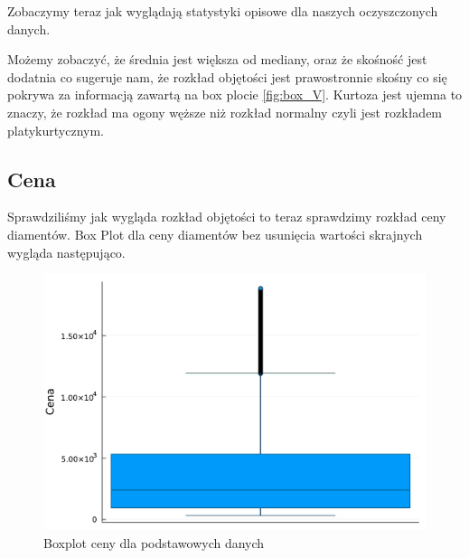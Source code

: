 \documentclass[12pt,leqno]{article}
\theoremstyle{exer}
\begin{document}
	Zobaczymy teraz jak wyglądają statystyki opisowe dla naszych oczyszczonych danych.
	
	\begin{table}[H]
		\caption{Podstawowe statystyki opisowe dla objętości}
		\label{tab:statystyki_V}
	\end{table}
	Możemy zobaczyć, że średnia jest większa  od mediany, oraz że skośność jest dodatnia co sugeruje nam, że rozkład objętości jest prawostronnie skośny co się pokrywa za informacją zawartą na box plocie \ref{fig:box_V}. Kurtoza jest ujemna to znaczy, że rozkład ma ogony węższe niż rozkład normalny czyli jest rozkładem platykurtycznym. 
	
	\subsection{Cena}
	Sprawdziliśmy jak wygląda rozkład objętości to teraz sprawdzimy rozkład ceny diamentów.
	Box Plot dla ceny diamentów bez usunięcia wartości skrajnych wygląda następująco.
	\begin{figure}[H]
		\centering
		\includegraphics[width=4\columnwidth/5]{images/boxplot_price_danych.pdf}
		\caption{Boxplot ceny dla podstawowych danych}
		\label{fig:box_price_orginal}
	\end{figure}
	
\end{document}
